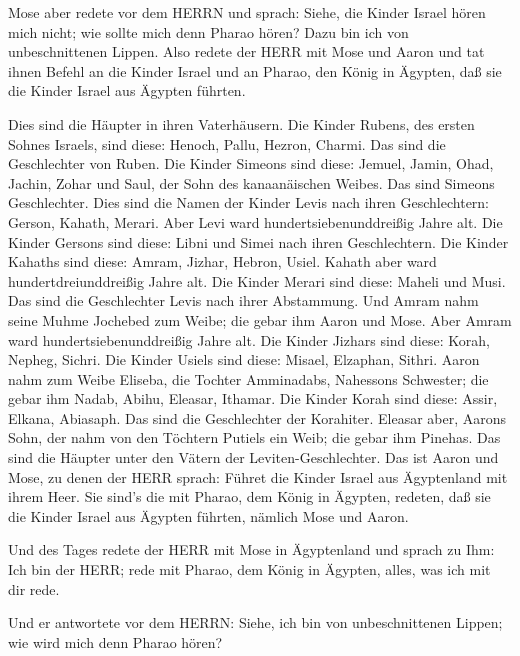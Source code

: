  Mose aber redete vor dem HERRN und sprach: Siehe, die
Kinder Israel hören mich nicht; wie sollte mich denn Pharao hören? Dazu
bin ich von unbeschnittenen Lippen.  Also redete der HERR
mit Mose und Aaron und tat ihnen Befehl an die Kinder Israel und an
Pharao, den König in Ägypten, daß sie die Kinder Israel aus Ägypten
führten.

 Dies sind die Häupter in ihren Vaterhäusern. Die Kinder
Rubens, des ersten Sohnes Israels, sind diese: Henoch, Pallu, Hezron,
Charmi. Das sind die Geschlechter von Ruben.  Die Kinder
Simeons sind diese: Jemuel, Jamin, Ohad, Jachin, Zohar und Saul, der
Sohn des kanaanäischen Weibes. Das sind Simeons Geschlechter.
 Dies sind die Namen der Kinder Levis nach ihren
Geschlechtern: Gerson, Kahath, Merari. Aber Levi ward
hundertsiebenunddreißig Jahre alt.  Die Kinder Gersons sind
diese: Libni und Simei nach ihren Geschlechtern.  Die
Kinder Kahaths sind diese: Amram, Jizhar, Hebron, Usiel. Kahath aber
ward hundertdreiunddreißig Jahre alt.  Die Kinder Merari
sind diese: Maheli und Musi. Das sind die Geschlechter Levis nach ihrer
Abstammung.  Und Amram nahm seine Muhme Jochebed zum Weibe;
die gebar ihm Aaron und Mose. Aber Amram ward hundertsiebenunddreißig
Jahre alt.  Die Kinder Jizhars sind diese: Korah, Nepheg,
Sichri.  Die Kinder Usiels sind diese: Misael, Elzaphan,
Sithri.  Aaron nahm zum Weibe Eliseba, die Tochter
Amminadabs, Nahessons Schwester; die gebar ihm Nadab, Abihu, Eleasar,
Ithamar.  Die Kinder Korah sind diese: Assir, Elkana,
Abiasaph. Das sind die Geschlechter der Korahiter.  Eleasar
aber, Aarons Sohn, der nahm von den Töchtern Putiels ein Weib; die gebar
ihm Pinehas. Das sind die Häupter unter den Vätern der
Leviten-Geschlechter.  Das ist Aaron und Mose, zu denen der
HERR sprach: Führet die Kinder Israel aus Ägyptenland mit ihrem Heer.
 Sie sind's die mit Pharao, dem König in Ägypten, redeten,
daß sie die Kinder Israel aus Ägypten führten, nämlich Mose und Aaron.

 Und des Tages redete der HERR mit Mose in Ägyptenland
 und sprach zu Ihm: Ich bin der HERR; rede mit Pharao, dem
König in Ägypten, alles, was ich mit dir rede.

 Und er antwortete vor dem HERRN: Siehe, ich bin von
unbeschnittenen Lippen; wie wird mich denn Pharao hören?

